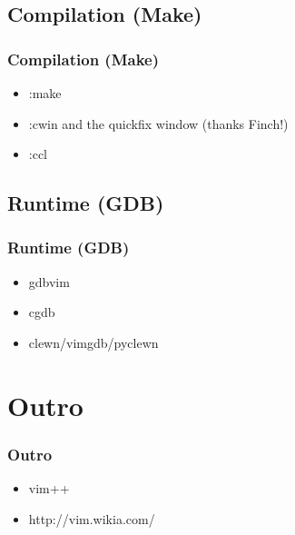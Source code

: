 \documentclass{beamer}
\begin{document}
\subsection{Compilation (Make)}
\frame
{
    \frametitle{Compilation (Make)}

    \begin{itemize}
        \item :make
        \item :cwin and the quickfix window (thanks Finch!)
        \item :ccl
    \end{itemize}
}

\subsection{Runtime (GDB)}
\frame
{
    \frametitle{Runtime (GDB)}

    \begin{itemize}
        \item gdbvim
        \item cgdb
        \item clewn/vimgdb/pyclewn
    \end{itemize}
}

\section{Outro}
\frame
{
    \frametitle{Outro}

    \begin{itemize}
        \item vim++
        \item http://vim.wikia.com/
    \end{itemize}
}
\end{document}
